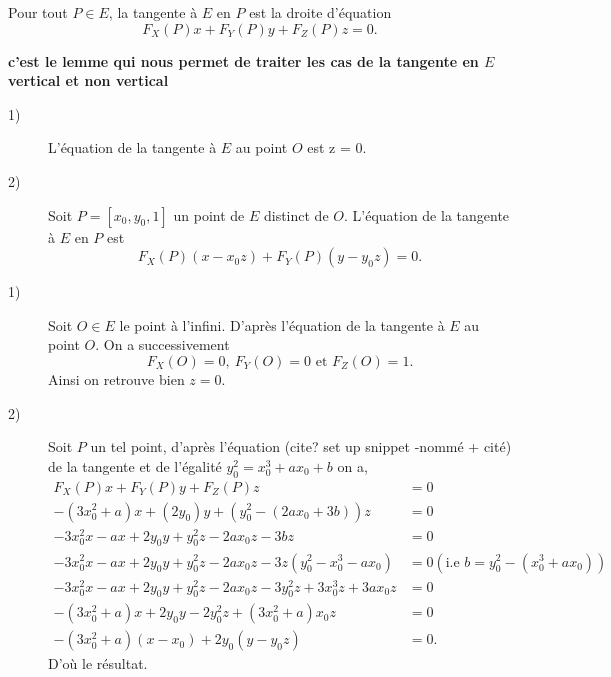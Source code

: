\begin{definition}
    Pour tout $P \in E$, la tangente à $E$ en $P$ est la droite d'équation
    \[
    F_{X}(P)x+F_{Y}(P)y+F_{Z}(P)z=0
    .\] 
\end{definition}

\textbf{c'est le lemme qui nous permet de traiter les cas de la tangente en $E$ vertical et
non vertical}

\begin{lemme}
    \label{lem:lemme4}
    
    \begin{description}
        \item[1)] L'équation de la tangente à $E$ au point $O$ est z = 0.
        \item[2)] Soit $P = \left[ x_0, y_0, 1 \right]$ un point de $E$ distinct de $O$. L'équation de la tangente à $E$ en $P$ est
            \[
            F_{X}(P)\left( x - x_0z \right) + F_{Y}(P)\left( y - y_0z \right) = 0
            .\] 
    \end{description}
\end{lemme}

\begin{demonstration}
    \begin{description}
        \item[1)] Soit  $O \in E$ le point à l'infini. D'après l'équation de la tangente à $E$ au point $O$. On a successivement 
            \[
            F_{X}(O) = 0, \ F_{Y}(O) = 0 \text{ et } F_{Z}(O) = 1
            .\] 
            Ainsi on retrouve bien $z = 0$.

        \item[2)] Soit $P$ un tel point, d'après l'équation (cite? set up snippet -nommé + cité) de la tangente et de l'égalité $y_0^2 = x_0^3 + ax_0 + b$ on a,
            \begin{align*}
                F_{X}(P)x + F_{Y}(P)y + F_{Z}(P)z &= 0 \\
                - \left( 3x_0^2 + a \right)x + \left( 2y_0 \right)y + \left( y_0^2 - \left( 2ax_0 + 3b \right) \right)z &= 0 \\
                - 3x_0^2x - ax + 2y_0y + y_0^2z - 2ax_0z - 3bz &= 0 \\ 
                - 3x_0^2x - ax + 2y_0y + y_0^2z - 2ax_0z - 3z\left( y_0^2 - x_0^3 - ax_0 \right) &= 0 \left( \text{i.e } b = y_0^2 - \left( x_0^3 + ax_0 \right) \right) \\
                - 3x_0^2x -ax + 2y_0y + y_0^2z - 2ax_0z - 3y_0^2z + 3x_0^3z + 3ax_0z &= 0 \\
                - \left( 3x_0^2 + a \right)x + 2y_0y - 2y_0^2z + \left( 3x_0^2 + a \right)x_0z &= 0\\
                - \left( 3x_0^2 + a \right)\left( x - x_0 \right) + 2y_0\left( y - y_0z \right) &= 0
            .\end{align*}
            D'où le résultat.
    \end{description}
    
\end{demonstration}


